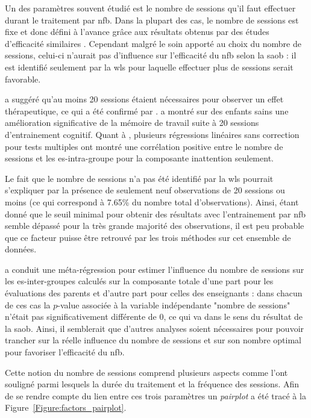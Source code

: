 Un des paramètres souvent étudié est le nombre de sessions qu'il faut effectuer durant le traitement par \gls{nfb}. Dans la plupart des cas, le nombre 
de sessions est fixe et donc défini à l'avance grâce aux résultats obtenus par des études d'efficacité similaires \citep{Enriquez2017}. Cependant malgré le soin apporté
au choix du nombre de sessions, celui-ci n'aurait pas d'influence sur l'efficacité du \gls{nfb} selon la \gls{saob} : il est identifié seulement par la \gls{wls} pour laquelle effectuer 
plus de sessions serait favorable. 

\citet{Vernon2004} a suggéré qu'au moins 20 sessions étaient nécessaires pour observer un effet thérapeutique, 
ce qui a été confirmé par \citet{Arns2014, Arns2009, Wang2014}. 
\citet{Wang2014} a montré sur des enfants sains une amélioration significative de la mémoire de travail suite à 20 sessions d'entrainement cognitif.
Quant à \citet{Arns2009}, plusieurs régressions linéaires sans correction pour tests multiples ont montré une
corrélation positive entre le nombre de sessions et les \gls{es}-intra-groupe pour la composante inattention seulement. 

Le fait que le nombre de sessions n'a pas été identifié par la \gls{wls}
pourrait s'expliquer par la présence de seulement neuf observations de 20 sessions ou moins (ce qui correspond à 7.65\% du nombre total d'observations). 
Ainsi, étant donné que le seuil minimal pour obtenir des résultats avec l'entrainement par \gls{nfb} semble dépassé pour la très grande majorité des observations, 
il est peu probable que ce facteur puisse être retrouvé par les trois méthodes sur cet ensemble de données. 

\citet{Cortese2016} a conduit une méta-régression pour estimer l'influence du nombre de sessions
sur les \gls{es}-inter-groupes calculés sur la composante totale d'une part pour les évaluations des parents et d'autre part pour celles des enseignants : 
dans chacun de ces cas la $p$-value associée à la variable indépendante "nombre de sessions" n'était pas significativement différente de 0, ce qui va dans le sens 
du résultat de la \gls{saob}. Ainsi, il semblerait que d'autres analyses soient nécessaires pour pouvoir trancher sur la réelle influence du nombre de sessions 
et sur son nombre optimal pour favoriser l'efficacité du \gls{nfb}.

Cette notion du nombre de sessions comprend plusieurs aspects comme l'ont souligné \citet{Strehl2014} parmi lesquels la durée du traitement et la fréquence des 
sessions. Afin de se rendre compte du lien entre ces trois paramètres un \textit{pairplot} a été tracé à la Figure~\ref{Figure:factors_pairplot}.

